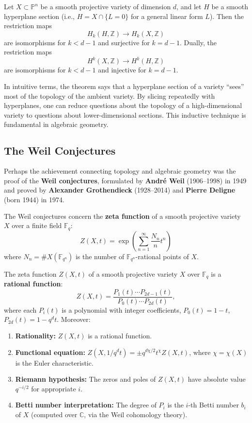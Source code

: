 \begin{theorem}\label{thm:lefschetz}
Let $X \subset \mathbb{P}^n$ be a smooth projective variety of dimension $d$, and let $H$ be a smooth hyperplane section (i.e., $H = X \cap \{L = 0\}$ for a general linear form $L$). Then the restriction maps
\[
    H_k(H, \mathbb{Z}) \to H_k(X, \mathbb{Z})
\]
are isomorphisms for $k < d - 1$ and surjective for $k = d - 1$. Dually, the restriction maps
\[
    H^k(X, \mathbb{Z}) \to H^k(H, \mathbb{Z})
\]
are isomorphisms for $k < d - 1$ and injective for $k = d - 1$.
\end{theorem}

In intuitive terms, the theorem says that a hyperplane section of a variety ``sees'' most of the topology of the ambient variety. By slicing repeatedly with hyperplanes, one can reduce questions about the topology of a high-dimensional variety to questions about lower-dimensional sections. This inductive technique is fundamental in algebraic geometry.

\subsection{The Weil Conjectures}

Perhaps the achievement connecting topology and algebraic geometry was the proof of the \textbf{Weil conjectures}, formulated by \textbf{Andr\'e Weil} (1906--1998) in 1949 and proved by \textbf{Alexander Grothendieck} (1928--2014) and \textbf{Pierre Deligne} (born 1944) in 1974.

The Weil conjectures concern the \textbf{zeta function} of a smooth projective variety $X$ over a finite field $\mathbb{F}_q$:
\[
    Z(X, t) = \exp\left(\sum_{n=1}^{\infty} \frac{N_n}{n} t^n\right)
\]
where $N_n = \#X(\mathbb{F}_{q^n})$ is the number of $\mathbb{F}_{q^n}$-rational points of $X$.

\begin{theorem}\label{thm:weil-conjectures}
The zeta function $Z(X, t)$ of a smooth projective variety $X$ over $\mathbb{F}_q$ is a \textbf{rational function}:
\[
Z(X, t) = \frac{P_1(t)\cdots P_{2d-1}(t)}{P_0(t)\cdots P_{2d}(t)},
\]
where each $P_i(t)$ is a polynomial with integer coefficients, $P_0(t)=1-t$, $P_{2d}(t)=1-q^d t$. Moreover:
\begin{enumerate}
    \item \textbf{Rationality:} $Z(X, t)$ is a rational function.
    \item \textbf{Functional equation:} $Z(X, 1/q^d t) = \pm q^{d\chi/2} t^{\chi} Z(X, t)$, where $\chi = \chi(X)$ is the Euler characteristic.
    \item \textbf{Riemann hypothesis:} The zeros and poles of $Z(X, t)$ have absolute value $q^{-i/2}$ for appropriate $i$.
    \item \textbf{Betti number interpretation:} The degree of $P_i$ is the $i$-th Betti number $b_i$ of $X$ (computed over $\mathbb{C}$, via the Weil cohomology theory).
\end{enumerate}
\end{theorem}

